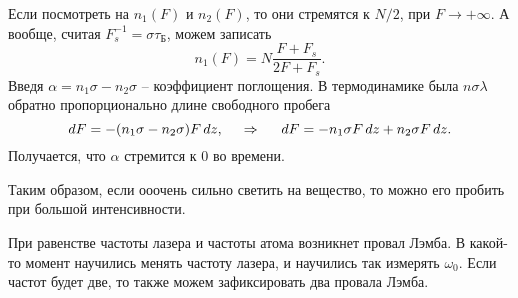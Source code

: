 Если посмотреть на $n_1(F)$ и $n_2(F)$, то они стремятся к $N/2$, при $F \to + \infty$. А вообще, считая $F_s^{-1} = \sigma \tau_{\text{Б}}$, можем записать
\begin{equation*}
    n_1 (F) = N \frac{F + F_s}{2 F + F_s}.
\end{equation*}
Введя $\alpha = n_1 \sigma - n_2 \sigma$ -- коэффициент поглощения. В термодинамике была $n \sigma \lambda$ обратно пропорционально длине свободного пробега
\begin{equation*}
    d F =  - (n_1 \sigma - n_2 \sigma) F \, d z,
    \hspace{0.5cm} \Rightarrow \hspace{0.5cm}
    d F = - n_1 \sigma F \, d z + n_2 \sigma F \, d z.
\end{equation*}
Получается, что $\alpha$ стремится к $0$ во времени. 


Таким образом, если ооочень сильно светить на вещество, то можно его пробить при большой интенсивности. 

При равенстве частоты лазера и частоты атома возникнет провал Лэмба. В какой-то момент научились менять частоту лазера, и научились так измерять $\omega_0$. Если частот будет две, то также можем зафиксировать два провала Лэмба.


